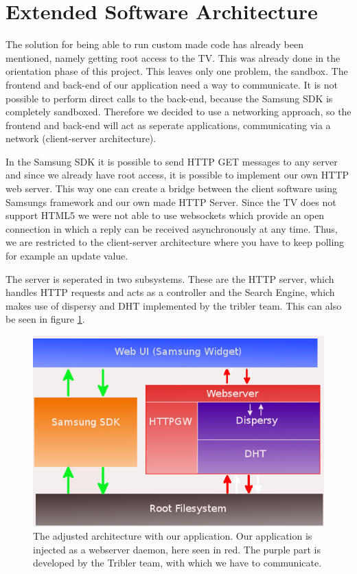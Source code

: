 \clearpage

\section{Extended Software Architecture}
The solution for being able to run custom made code has already been mentioned, namely getting root access to the TV.
This was already done in the orientation phase of this project. This leaves only one problem, the sandbox.
The frontend and back-end of our application need a way to communicate. It is not possible to perform direct calls to the back-end, because the 
Samsung SDK is completely sandboxed. Therefore we decided to use a networking approach, so the frontend and back-end will act as seperate 
applications, communicating via a network (client-server architecture).

In the Samsung SDK it is possible to send HTTP GET messages to any server and since we already have root access, it is possible to implement
our own HTTP web server. This way one can create a bridge between the client software using Samsung\textquotesingle s framework and our own made 
HTTP Server. Since the TV does not support HTML5 we were not able to use websockets which provide an open connection in which a reply can be 
received asynchronously at any time. Thus, we are restricted to the client-server architecture where you have to keep polling for example an 
update value.

The server is seperated in two subsystems. These are the HTTP server, which handles HTTP requests and acts as a controller and the Search Engine, 
which makes use of dispersy and DHT implemented by the tribler team. This can also be seen in figure \ref{fig:architecture}.

\begin{center}
\begin{figure}[h]
	\centering
	\mbox{\includegraphics[width=1\textwidth]{Images/architecture.png}}
	\caption{The adjusted architecture with our application. Our application is injected as a webserver daemon, here seen in red. 
	The purple part is developed by the Tribler team, with which we have to communicate.}
	\label{fig:architecture}
\end{figure}
\end{center}
\clearpage

